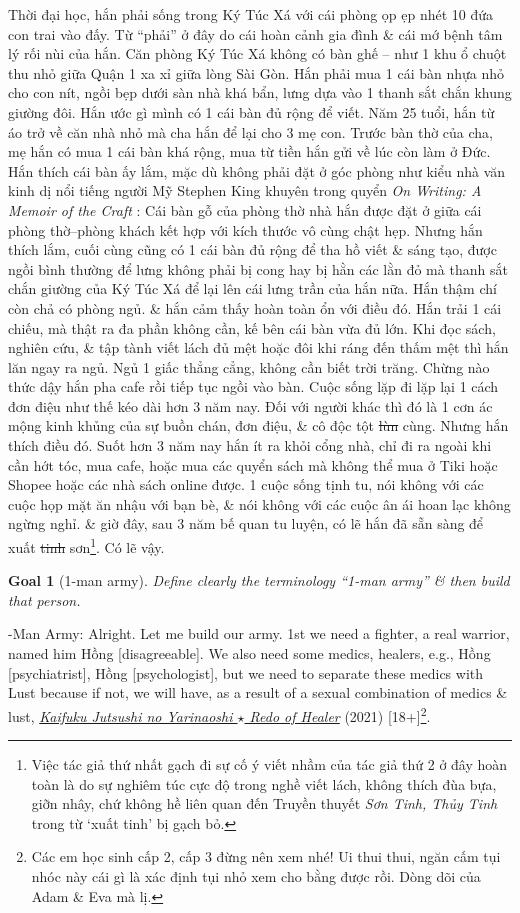 \documentclass[12pt,oneside]{book}
\newtheorem{goal}{Goal}
\begin{document}
Thời đại học, hắn phải sống trong Ký Túc Xá với cái phòng ọp ẹp nhét 10 đứa con trai vào đấy. Từ ``phải'' ở đây do cái hoàn cảnh gia đình \& cái mớ bệnh tâm lý rối nùi của hắn. Căn phòng Ký Túc Xá không có bàn ghế -- như 1 khu ổ chuột thu nhỏ giữa Quận 1 xa xỉ giữa lòng Sài Gòn. Hắn phải mua 1 cái bàn nhựa nhỏ cho con nít, ngồi bẹp dưới sàn nhà khá bẩn, lưng dựa vào 1 thanh sắt chắn khung giường đôi. Hắn ước gì mình có 1 cái bàn đủ rộng để viết. Năm 25 tuổi, hắn từ {\sc á}o trở về căn nhà nhỏ mà cha hắn để lại cho 3 mẹ con. Trước bàn thờ của cha, mẹ hắn có mua 1 cái bàn khá rộng, mua từ tiền hắn gửi về lúc còn làm ở Đức. Hắn thích cái bàn ấy lắm, mặc dù không phải đặt ở góc phòng như kiểu nhà văn kinh dị nổi tiếng người Mỹ {\sc Stephen King} khuyên trong quyển {\it On Writing: A Memoir of the Craft} \cite{King2000,King2010}: Cái bàn gỗ của phòng thờ nhà hắn được đặt ở giữa cái phòng thờ--phòng khách kết hợp với kích thước vô cùng chật hẹp. Nhưng hắn thích lắm, cuối cùng cũng có 1 cái bàn đủ rộng để tha hồ viết \& sáng tạo, được ngồi bình thường để lưng không phải bị cong hay bị hằn các lằn đỏ mà thanh sắt chắn giường của Ký Túc Xá để lại lên cái lưng trần của hắn nữa. Hắn thậm chí còn chả có phòng ngủ. \& hắn cảm thấy hoàn toàn ổn với điều đó. Hắn trải 1 cái chiếu, mà thật ra đa phần không cần, kế bên cái bàn vừa đủ lớn. Khi đọc sách, nghiên cứu, \& tập tành viết lách đủ mệt hoặc đôi khi ráng đến thấm mệt thì hắn lăn ngay ra ngủ. Ngủ 1 giấc thẳng cẳng, không cần biết trời trăng. Chừng nào thức dậy hắn pha cafe rồi tiếp tục ngồi vào bàn. Cuộc sống lặp đi lặp lại 1 cách đơn điệu như thế kéo dài hơn 3 năm nay. Đối với người khác thì đó là 1 cơn ác mộng kinh khủng của sự  buồn chán, đơn điệu, \& cô độc tột \st{lùn} cùng. Nhưng hắn thích điều đó. Suốt hơn 3 năm nay hắn ít ra khỏi cổng nhà, chỉ đi ra ngoài khi cần hớt tóc, mua cafe, hoặc mua các quyển sách mà không thể mua ở Tiki hoặc Shopee hoặc các nhà sách online được. 1 cuộc sống tịnh tu, nói không với các cuộc họp mặt ăn nhậu với bạn bè, \& nói không với các cuộc ân ái hoan lạc không ngừng nghỉ. \& giờ đây, sau 3 năm bế quan tu luyện, có lẽ hắn đã sẵn sàng để xuất \st{tinh} sơn\footnote{Việc tác giả thứ nhất gạch đi sự cố ý viết nhầm của tác giả thứ 2 ở đây hoàn toàn là do sự nghiêm túc cực độ trong nghề viết lách, không thích đùa bựa, giỡn nhây, chứ không hề liên quan đến Truyền thuyết {\it Sơn Tinh, Thủy Tinh} trong từ `xuất tinh' bị gạch bỏ.}. Có lẽ vậy.

\begin{goal}[1-man army]
	Define clearly the terminology ``1-man army'' \& then build that person.
\end{goal}
{-Man Army}: Alright. Let me build our army. 1st we need a fighter, a real warrior, named him {\sf Hồng [disagreeable]}. We also need some medics, healers, e.g., {\sf Hồng [psychiatrist], Hồng [psychologist]}, but we need to separate these medics with {\sc Lust} because if not, we will have, as a result of a sexual combination of medics \& lust, \href{https://www.imdb.com/title/tt13370404/}{\it Kaifuku Jutsushi no Yarinaoshi $\star$ Redo of Healer} (2021) [18+]\footnote{Các em học sinh cấp 2, cấp 3 đừng nên xem nhé! Ui thui thui, ngăn cấm tụi nhóc này cái gì là xác định tụi nhỏ xem cho bằng được rồi. Dòng dõi của {\sf Adam \& Eva} mà lị.}.
\end{document}
